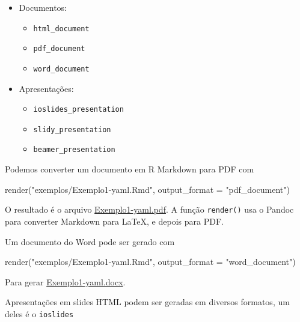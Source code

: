 \documentclass[
  10pt,
  a4paper]{book}
\newenvironment{Shaded}{\begin{snugshade}}{\end{snugshade}}
\newcommand{\AttributeTok}[1]{\textcolor[rgb]{0.77,0.63,0.00}{#1}}
\newcommand{\FunctionTok}[1]{\textcolor[rgb]{0.00,0.00,0.00}{#1}}
\newcommand{\NormalTok}[1]{#1}
\newcommand{\StringTok}[1]{\textcolor[rgb]{0.31,0.60,0.02}{#1}}
\providecommand{\tightlist}{%
  \setlength{\itemsep}{0pt}\setlength{\parskip}{0pt}}
\begin{document}
\begin{itemize}
\tightlist
\item
  Documentos:

  \begin{itemize}
  \tightlist
  \item
    \texttt{html\_document}
  \item
    \texttt{pdf\_document}
  \item
    \texttt{word\_document}
  \end{itemize}
\item
  Apresentações:

  \begin{itemize}
  \tightlist
  \item
    \texttt{ioslides\_presentation}
  \item
    \texttt{slidy\_presentation}
  \item
    \texttt{beamer\_presentation}
  \end{itemize}
\end{itemize}

Podemos converter um documento em R Markdown para PDF com

\begin{Shaded}
\begin{Highlighting}[]
\FunctionTok{render}\NormalTok{(}\StringTok{"exemplos/Exemplo1{-}yaml.Rmd"}\NormalTok{, }\AttributeTok{output\_format =} \StringTok{"pdf\_document"}\NormalTok{)}
\end{Highlighting}
\end{Shaded}

O resultado é o arquivo
\href{exemplos/Exemplo1-yaml.pdf}{Exemplo1-yaml.pdf}. A função \texttt{render()}
usa o Pandoc para converter Markdown para LaTeX, e depois para PDF.

Um documento do Word pode ser gerado com

\begin{Shaded}
\begin{Highlighting}[]
\FunctionTok{render}\NormalTok{(}\StringTok{"exemplos/Exemplo1{-}yaml.Rmd"}\NormalTok{, }\AttributeTok{output\_format =} \StringTok{"word\_document"}\NormalTok{)}
\end{Highlighting}
\end{Shaded}

Para gerar \href{exemplos/Exemplo1-knitr.docx}{Exemplo1-yaml.docx}.

Apresentações em slides HTML podem ser geradas em diversos formatos, um
deles é o \texttt{ioslides}
\end{document}
